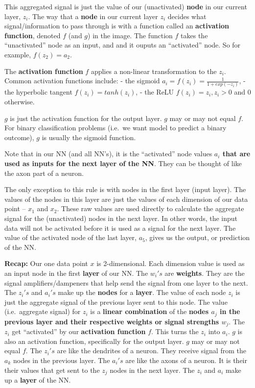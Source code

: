 \documentclass[
]{article}
\begin{document}
This aggregated signal is just the value of our (unactivated)
\textbf{node} in our current layer, \(z_i\). The way that a
\textbf{node} in our current layer \(z_i\) decides what
signal/information to pass through is with a function called an
\textbf{activation function}, denoted \(f\) (and \(g\)) in the image.
The function \(f\) takes the ``unactivated'' node as an input, and and
it ouputs an ``activated'' node. So for example, \(f(z_2) = a_2\).

The \textbf{activation function} \(f\) applies a non-linear
transformation to the \(z_i\). Common activation functions include: -
the sigmoid \(a_i = f(z_i) = \frac{1}{1+exp(-z_i)}\), - the hyperbolic
tangent \(f(z_i) = tanh(z_i)\), - the ReLU \(f(z_i) = z_i, z_i > 0\) and
\(0\) otherwise.

\(g\) is just the activation function for the output layer. \(g\) may or
may not equal \(f\). For binary classification problems (i.e.~we want
model to predict a binary outcome), \(g\) is usually the sigmoid
function.

Note that in our NN (and all NN's), it is the ``activated'' node values
\textbf{\(a_i\) that are used as inputs for the next layer of the NN}.
They can be thought of like the axon part of a neuron.

The only exception to this rule is with nodes in the first layer (input
layer). The values of the nodes in this layer are just the values of
each dimension of our data point -- \(x_1\) and \(x_2\). These raw
values are used directly to calculate the aggregate signal for the
(unactivated) nodes in the next layer. In other words, the input data
will not be activated before it is used as a signal for the next layer.
The value of the activated node of the last layer, \(a_5\), gives us the
output, or prediction of the NN.

\textbf{Recap:} Our one data point \(x\) is 2-dimensional. Each
dimension value is used as an input node in the first \textbf{layer} of
our NN. The \(w_i's\) are \textbf{weights}. They are the signal
amplifiers/dampeners that help send the signal from one layer to the
next. The \(z_i's\) and \(a_i's\) make up the \textbf{nodes} for a
\textbf{layer}. The value of each node \(z_i\) is just the aggregate
signal of the previous layer sent to this node. The value
(i.e.~aggregate signal) for \(z_i\) is a \textbf{linear combination} of
the \textbf{nodes \(a_j\) in the previous layer and their respective
weights or signal strengths \(w_j\)}. The \(z_i\) get ``activated'' by
our \textbf{activation function} \(f\). This turns the \(z_i\) into
\(a_i\). \(g\) is also an activation function, specifically for the
output layer. \(g\) may or may not equal \(f\). The \(z_i's\) are like
the dendrites of a neuron. They receive signal from the \(a_k\) nodes in
the previous layer. The \(a_i's\) are like the axons of a neuron. It is
their their values that get sent to the \(z_j\) nodes in the next layer.
The \(z_i\) and \(a_i\) make up a \textbf{layer} of the NN.
\end{document}
